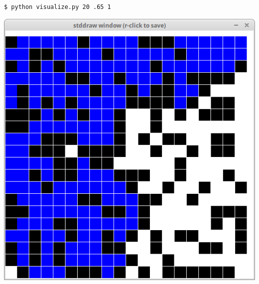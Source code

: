 \documentclass[8pt,a4paper,compress,handout]{beamer}
\begin{document}
\begin{frame}[fragile]
\begin{minipage}{160pt}
\begin{lstlisting}[language={}]
$ python visualize.py 20 .65 1
\end{lstlisting}
\end{minipage}%
\begin{minipage}{140pt}
\hfill \includegraphics[scale=0.15]{figures/percolation7.png}
\end{minipage}

\smallskip


\end{frame}
\end{document}
